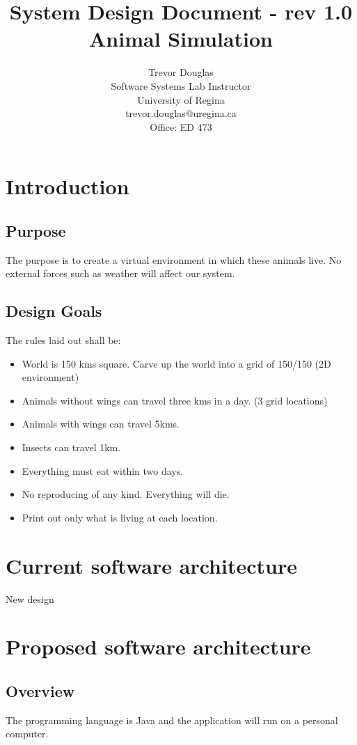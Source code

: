 \documentclass[11pt]{article}
\title{System Design Document - rev 1.0\\
 Animal Simulation}
\author{Trevor Douglas\\
Software Systems Lab Instructor\\
University of Regina\\
trevor.douglas@uregina.ca\\
Office: ED 473}
\begin{document}
         
\maketitle

\section{Introduction}
\subsection{Purpose}
The purpose is to create a virtual environment in which these animals live.  No external forces such as weather will affect our system.
\subsection{Design Goals}
The rules laid out shall be:
\begin{itemize}
  \item World is 150 kms square.  Carve up the world into a grid of 150/150 (2D environment)
  \item Animals without wings can travel three kms in a day. (3 grid locations)
  \item Animals with wings can travel 5kms. 
  \item Insects can travel 1km.
  \item Everything must eat within two days.
  \item No reproducing of any kind.  Everything will die.
  \item Print out only what is living at each location.
\end{itemize}

\section{Current software architecture}
New design

\section{ Proposed software architecture}
\subsection{Overview}
The programming language is Java and the application will run on a personal computer.
\end{document}

